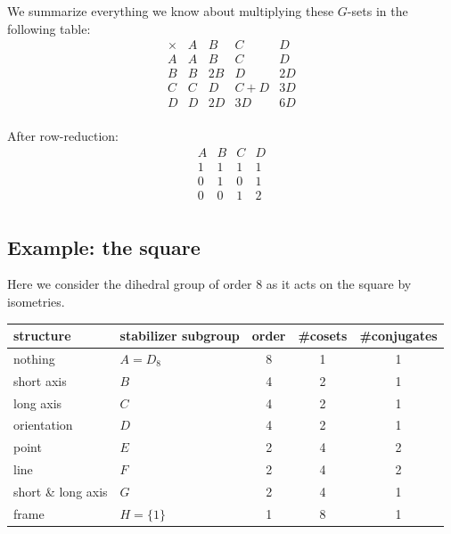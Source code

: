 \documentclass[11pt,oneside]{article}
\newcommand{\thinplus}{\!+\!}
\begin{document}
We summarize everything we know about 
multiplying these $G$-sets in the following table:
{\small
$$
\begin{array}{r|rrrr}
\times & A & B & C & D \\
\hline
A & A & B & C & D \\
B & B & 2B & D & 2D \\
C & C & D & C\thinplus D & 3D \\
D & D & 2D & 3D & 6D \\
\end{array}
$$
}

After row-reduction:
$$
\begin{array}{rrrr}
 A & B & C & D \\
\hline
1 & 1 & 1 & 1 \\
0 & 1 & 0 & 1 \\
0 & 0 & 1 & 2 \\
\end{array}
$$

\subsection{Example: the square}

Here we consider the dihedral group of order 8 as
it acts on the square by isometries.

\begin{samepage}
\begin{center}
\begin{tabular}{ |l|l|c|c|c| }
\hline
structure & stabilizer subgroup & order & \#cosets & \#conjugates \\
\hline
\hline
nothing & $A=D_8$ &       8        &  1      &   1         \\
\hline
short axis& $B$ &       4        &  2      &   1         \\
\hline
long axis & $C$ &       4        &  2      &   1         \\
\hline
orientation & $D$ &       4        &  2      &   1         \\
\hline
point & $E$ &       2        &  4      &   2         \\
\hline
line  & $F$ &       2        &  4      &   2         \\
\hline
short \& long axis & $G$ &       2        &  4      &   1         \\
\hline
frame & $H=\{1\} $ &       1        &  8      &   1         \\
\hline
\end{tabular}
\end{center}
\end{samepage}
\end{document}
